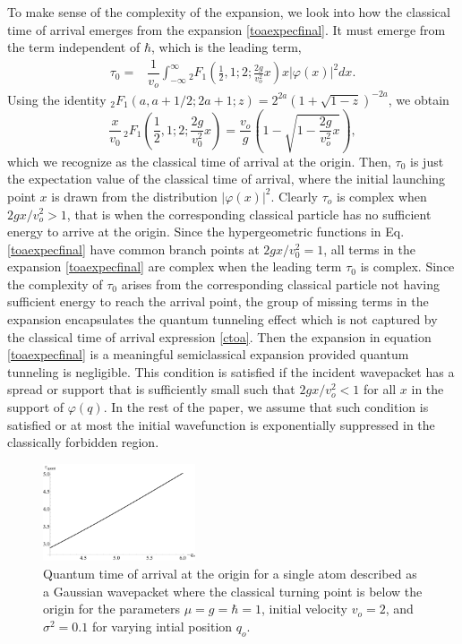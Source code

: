 \documentclass[%
 reprint,
 amsmath,amssymb,
 aps,
]{revtex4-1}
\begin{document}
To make sense of the complexity of the expansion, we look into how the classical time of arrival emerges from the expansion \eqref{toaexpecfinal}. It must emerge from the term independent of $\hbar$, which is the leading term, 
\begin{align}
\tau_{0}=&\dfrac{1}{v_o}\int_{-\infty}^{\infty}{_2 F_1}\left(\frac{1}{2},1;2;\frac{2 g}{v_o^2}x\right)x|\varphi(x)|^2 dx.
\label{term0}
\end{align}
Using the identity ${_2 F_1}(a,a+1/2;2a+1;z)=2^{2a}(1+\sqrt{1-z})^{-2a}$, we obtain
\begin{equation}
    \frac{x}{v_0} \, _2F_1\left(\frac{1}{2},1;2;\frac{2g}{v_0^2}x\right) =\dfrac{v_o}{g} \left(1 - \sqrt{1-\dfrac{2 g}{v_o^2}x} \right),\label{ctoa}
\end{equation}
which we recognize as the classical time of arrival at the origin. Then, $\tau_0$ is just the expectation value of the classical time of arrival, where the initial launching point $x$ is drawn from the distribution $|\varphi(x)|^2$. Clearly $\tau_o$ is complex when $2gx/v_o^2>1$, that is when the corresponding classical particle has no sufficient energy to arrive at the origin. Since the hypergeometric functions in Eq. \eqref{toaexpecfinal} have common branch points at $2gx/v_0^2=1$, all terms in the expansion \eqref{toaexpecfinal} are complex when the leading term $\tau_0$ is complex. Since the complexity of $\tau_0$ arises from the corresponding classical particle not having sufficient energy to reach the arrival point, the group of missing terms in the expansion encapsulates the quantum tunneling effect which is not captured by the classical time of arrival expression  \eqref{ctoa}. Then the expansion in equation \eqref{toaexpecfinal} is a meaningful semiclassical expansion provided quantum tunneling is negligible. This condition is satisfied if the incident wavepacket has a spread or support that is sufficiently small such that $2g x/v_o^2<1$ for all $x$ in the support of $\varphi(q)$. In the rest of the paper, we assume that such condition is satisfied or at most the initial wavefunction is exponentially suppressed in the classically forbidden region. 
\begin{figure}[t]
	\centering
	\includegraphics[width = 0.4\textwidth]{tunnel}
	\caption{Quantum time of arrival at the origin for a single atom described as a Gaussian wavepacket where the classical turning point is below the origin for the parameters $\mu=g=\hbar=1$, initial velocity $v_o=2$, and $\sigma^2=0.1$ for varying intial position $q_o$.}
	\label{fig:tunnel}
\end{figure}
\end{document}
